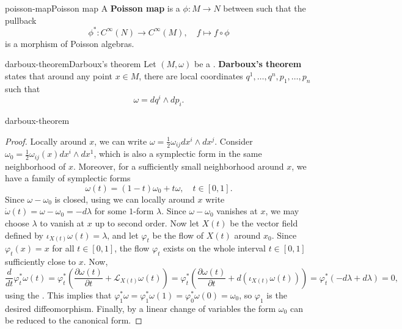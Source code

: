 \begin{topic}{poisson-map}{Poisson map}
    A \textbf{Poisson map} is a  $\phi : M \to N$ between  such that the pullback
    \[ \phi^* : C^\infty(N) \to C^\infty(M), \quad f \mapsto f \circ \phi \]
    is a morphism of Poisson algebras.
\end{topic}

\begin{topic}{darboux-theorem}{Darboux's theorem}
    Let $(M, \omega)$ be a . \textbf{Darboux's theorem} states that around any point $x \in M$, there are local coordinates $q^1, \ldots, q^n, p_1, \ldots, p_n$ such that
    \[ \omega = dq^i \wedge dp_i . \]
\end{topic}

\begin{example}{darboux-theorem}
    \begin{proof}
        Locally around $x$, we can write $\omega = \frac{1}{2} \omega_{ij} dx^i \wedge dx^j$. Consider $\omega_0 = \frac{1}{2} \omega_{ij}(x) dx^i \wedge dx^1$, which is also a symplectic form in the same neighborhood of $x$. Moreover, for a sufficiently small neighborhood around $x$, we have a family of symplectic forms
        \[ \omega(t) = (1 - t) \omega_0 + t \omega , \quad t \in [0, 1] . \]
        Since $\omega - \omega_0$ is closed, using  we can locally around $x$ write $\dot{\omega}(t) = \omega - \omega_0 = - d \lambda$ for some $1$-form $\lambda$. Since $\omega - \omega_0$ vanishes at $x$, we may choose $\lambda$ to vanish at $x$ up to second order. Now let $X(t)$ be the vector field defined by $\iota_{X(t)} \omega(t) = \lambda$, and let $\varphi_t$ be the flow of $X(t)$ around $x_0$. Since $\varphi_t(x) = x$ for all $t \in [0, 1]$, the flow $\varphi_t$ exists on the whole interval $t \in [0, 1]$ sufficiently close to $x$. Now,
        \[ \frac{d}{dt} \varphi_t^* \omega(t) = \varphi_t^* \left(\frac{\partial \omega(t)}{\partial t} + \mathcal{L}_{X(t)} \omega(t) \right) = \varphi_t^* \left(\frac{\partial \omega(t)}{\partial t} + d(\iota_{X(t)} \omega(t)) \right) = \varphi_t^* \left( -d \lambda + d \lambda \right) = 0 , \]
        using the . This implies that $\varphi_1^* \omega = \varphi_1^* \omega(1) = \varphi_0^* \omega(0) = \omega_0$, so $\varphi_1$ is the desired diffeomorphism. Finally, by a linear change of variables the form $\omega_0$ can be reduced to the canonical form.
    \end{proof}
\end{example}

